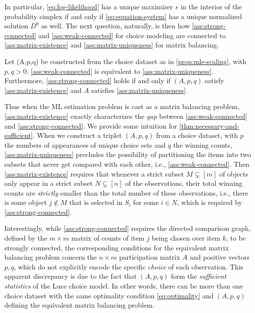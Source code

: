 In particular, \eqref{eq:log-likelihood} has a unique maximizer $s$ in the interior of the probability simplex if and only if \eqref{eq:equation-system} has a unique normalized solution $D^0$ as well. The next question, naturally, is then how \cref{ass:strong-connected} and \cref{ass:weak-connected} for choice modeling are connected to \cref{ass:matrix-existence} and \cref{ass:matrix-uniqueness} for matrix balancing.
\begin{theorem}
\label{thm:necessary-and-sufficient}
Let (A,p,q) be constructed from the choice dataset as in \cref{prop:mle-scaling}, with $p,q>0$. \cref{ass:weak-connected} is equivalent to \cref{ass:matrix-uniqueness}. Furthermore, \cref{ass:strong-connected} holds if and only if $(A,p,q)$ satisfy \cref{ass:matrix-existence} and $A$ satisfies \cref{ass:matrix-uniqueness}.
\end{theorem} 
Thus when the ML estimation problem is cast as a matrix balancing problem, \cref{ass:matrix-existence} exactly characterizes the \emph{gap} between \cref{ass:weak-connected} and \cref{ass:strong-connected}. 
 We provide some intuition for \cref{thm:necessary-and-sufficient}. When we construct a triplet $(A,p,q)$ from a choice dataset, with $p$ the numbers of appearances of unique choice sets and $q$ the winning counts, \cref{ass:matrix-uniqueness} precludes the possibility of partitioning the items into two subsets that never get compared with each other, i.e., \cref{ass:weak-connected}. Then \cref{ass:matrix-existence} requires that whenever a strict subset $M\subsetneq [m]$ of objects only appear in a strict subset $N\subsetneq [n]$ of the observations, their total winning counts are \emph{strictly} smaller than the total number of these observations, i.e., there is some object $j\notin M$ that is selected in $S_i$ for some $i\in N$, which is required by \cref{ass:strong-connected}.

Interestingly, while \cref{ass:strong-connected} requires the directed comparison graph, defined by the $m\times m$ matrix of counts of item $j$ being chosen over item $k$, to be strongly connected, the corresponding conditions for the equivalent matrix balancing problem concern the $n\times m$ participation matrix $A$ and positive vectors $p,q$, which do not explicitly encode the specific \emph{choice} of each observation. This apparent discrepancy is due to the fact that $(A,p,q)$ form the \emph{sufficient statistics} of the Luce choice model. In other words, there can be more than one choice dataset with the same optimality condition \eqref{eq:optimality} and $(A,p,q)$ defining the equivalent matrix balancing problem.


